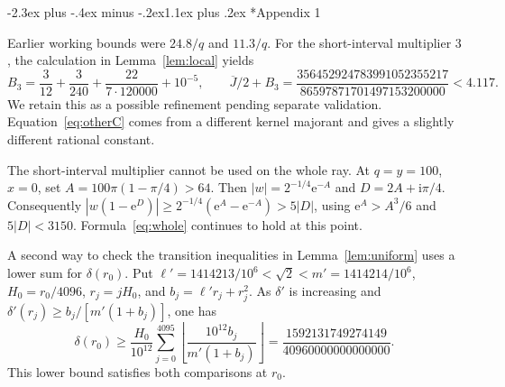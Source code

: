 \documentclass[11pt,a4paper]{article}
\makeatletter
\newcommand{\ii}{\mathrm i}
\newcommand{\e}{\mathrm e}
\renewcommand\section{\@startsection{section}{1}{\z@}
  {-2.3ex plus -.4ex minus -.2ex}{1.1ex plus .2ex}
  {\normalfont\large\bfseries\centering}}
\makeatother
\begin{document}
\section*{Appendix 1}
\enlargethispage{\baselineskip}

Earlier working bounds were $24.8/q$ and $11.3/q$. For the short-interval
multiplier $3$, the calculation in Lemma~\ref{lem:local} yields
\[
 B_3=\frac3{12}+\frac3{240}+\frac{22}{7\cdot120000}+10^{-5},
 \qquad
 \overline J/2+B_3=\frac{356452924783991052355217}{86597871701497153200000}<4.117 .
\]
We retain this as a possible refinement pending separate validation. Equation~\eqref{eq:otherC} comes from a different kernel
majorant and gives a slightly different rational constant.

The short-interval multiplier cannot be used on the whole ray. At
$q=y=100$, $x=0$, set $A=100\pi(1-\pi/4)>64$. Then
$|w|=2^{-1/4}\e^{-A}$ and $D=2A+\ii\pi/4$. Consequently
$|w(1-\e^D)|\ge 2^{-1/4}(\e^A-\e^{-A})>5|D|$,
using $\e^A>A^3/6$ and $5|D|<3150$. Formula~\eqref{eq:whole}
continues to hold at this point.

A second way to check the transition inequalities in
Lemma~\ref{lem:uniform} uses a lower sum for $\delta(r_0)$.
Put $\ell'=1414213/10^6<\sqrt2<m'=1414214/10^6$,
$H_0=r_0/4096$, $r_j=jH_0$, and $b_j=\ell' r_j+r_j^2$.
As $\delta'$ is increasing and
$\delta'(r_j)\ge b_j/[m'(1+b_j)]$, one has
\[
 \delta(r_0)\ge \frac{H_0}{10^{12}}
 \sum_{j=0}^{4095}\left\lfloor\frac{10^{12} b_j}{m'(1+b_j)}\right\rfloor
 =\frac{1592131749274149}{40960000000000000}.
\]
This lower bound satisfies both comparisons at $r_0$.
\end{document}
